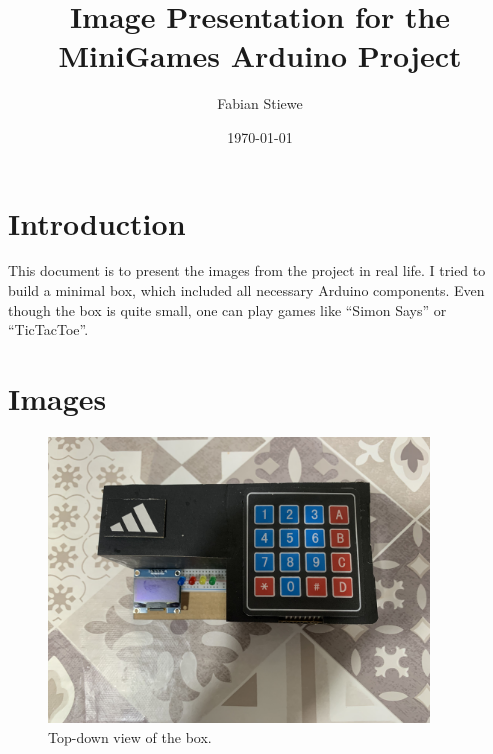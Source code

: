 \documentclass{article}
\begin{document}
\title{Image Presentation for the MiniGames Arduino Project}
\author{Fabian Stiewe}
\date{\today}
\maketitle

\newpage

\section{Introduction}
This document is to present the images from the project in real life. I tried to build a minimal box, which included all necessary Arduino components. Even though the box is quite small, one can play games like \enquote{Simon Says} or \enquote{TicTacToe}.

\newpage

\section{Images}
\begin{figure}[!h]
  \centering
  \vspace*{\fill}
  \includegraphics[width=0.9\textwidth]{TopDownView.jpg}
  \caption{Top-down view of the box.}
  \vspace*{\fill}
\end{figure}

\newpage
\end{document}
